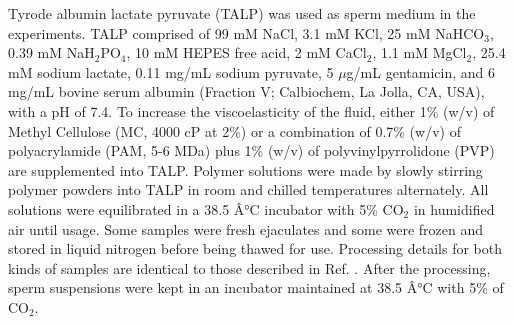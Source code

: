 \documentclass[reprint,unsortedaddress,amsmath,amssymb,aps,pre]{revtex4-2}
\begin{document}
Tyrode albumin lactate pyruvate (TALP) \cite{Parrish1988capacitation} was used as sperm medium in the experiments. TALP comprised of 99 mM NaCl, 3.1 mM KCl, 25 mM NaHCO$_3$, 0.39 mM NaH$_2$PO$_4$, 10 mM HEPES free acid, 2 mM CaCl$_2$, 1.1 mM MgCl$_2$, 25.4 mM sodium lactate, 0.11 mg/mL sodium pyruvate, 5 $\mu$g/mL gentamicin, and 6 mg/mL bovine serum albumin (Fraction V; Calbiochem, La Jolla, CA, USA), with a pH of 7.4. To increase the viscoelasticity of the fluid, either 1\% (w/v) of Methyl Cellulose (MC, 4000 cP at 2\%) or a combination of 0.7\% (w/v) of polyacrylamide (PAM, 5-6 MDa) plus 1\% (w/v) of polyvinylpyrrolidone (PVP) are supplemented into TALP. Polymer solutions were made by slowly stirring polymer powders into TALP in room and chilled temperatures alternately. All solutions were equilibrated in a 38.5 Â°C incubator with 5\% CO$_2$ in humidified air until usage. Some samples were fresh ejaculates and some were frozen and stored in liquid nitrogen before being thawed for use. Processing details for both kinds of samples are identical to those described in Ref. \cite{Walker2021computer}. After the processing, sperm suspensions were kept in an incubator maintained at 38.5 Â°C with 5\% of CO$_2$.
\end{document}
